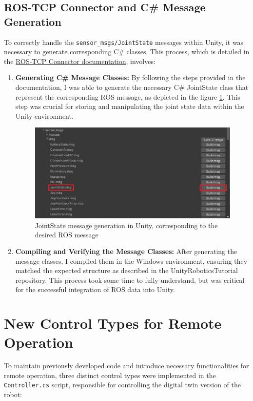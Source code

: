     \subsection{ROS-TCP Connector and C\# Message Generation}
    
    To correctly handle the \texttt{sensor\_msgs/JointState} messages within Unity, it was necessary to generate corresponding C\# classes. This process, which is detailed in the \href{https://github.com/Unity-Technologies/ROS-TCP-Connector/blob/main/MessageGeneration.md}{ROS-TCP Connector documentation}, involves:
    \begin{enumerate}
        \item \textbf{Generating C\# Message Classes:} By following the steps provided in the documentation, I was able to generate the necessary C\# JointState class that represent the corresponding ROS message, as depicted in the figure \ref{fig:unityjoint_state_message}. This step was crucial for storing and manipulating the joint state data within the Unity environment.
        \begin{figure}
        \centering
        \includegraphics[width=0.75\linewidth]{figs/unityjoint_state_message.png}
        \caption{JointState message generation in Unity, corresponding to the desired ROS message}
        \label{fig:unityjoint_state_message}
        \end{figure}
        \item \textbf{Compiling and Verifying the Message Classes:} After generating the message classes, I compiled them in the Windows environment, ensuring they matched the expected structure as described in the UnityRoboticsTutorial repository. This process took some time to fully understand, but was critical for the successful integration of ROS data into Unity.
    \end{enumerate}
    
    \section{New Control Types for Remote Operation}
    To maintain previously developed code and introduce necessary functionalities for remote operation, three distinct control types were implemented in the \texttt{Controller.cs} script, responsible for controlling the digital twin version of the robot:
    
